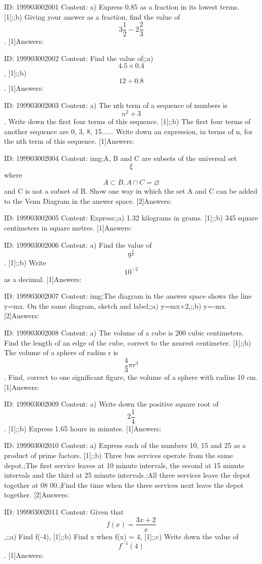 \documentclass{article}
\begin{document}
ID: 199903002001
Content:
a) Express 0.85 as a fraction in its lowest terms. [1];;b) Giving your answer as a fraction, find the value of $$3 \frac{1}{2} - 2 \frac{2}{3}$$. [1]Answers:

ID: 199903002002
Content:
Find the value of;;a) $$4.5 \times 0.4$$, [1];;b) $$12 \div 0.8$$. [1]Answers:

ID: 199903002003
Content:
a) The nth term of a sequence of numbers is $$n^2 + 3$$. Write down the first four terms of this sequence. [1];;b) The first four terms of another sequence are 0, 3, 8, 15...... Write down an expression, in terms of n, for the nth term of this sequence. [1]Answers:

ID: 199903002004
Content:
img;A, B and C are subsets of the universal set $$\xi$$ where $$A \subset B, A \cap C = \varnothing$$ and C is not a subset of B. Show one way in which the set A and C can be added to the Venn Diagram in the answer space. [2]Answers:

ID: 199903002005
Content:
Express;;a) 1.32 kilograms in grams. [1];;b) 345 square centimeters in square metres. [1]Answers:

ID: 199903002006
Content:
a) Find the value of $$9^{\frac{3}{2}}$$. [1];;b) Write $$10^{-2}$$ as a decimal. [1]Answers:

ID: 199903002007
Content:
img;The diagram in the answer space shows the line y=mx. On the same diagram, sketch and label;;a) y=mx+2,;;b) y=-mx. [2]Answers:

ID: 199903002008
Content:
a) The volume of a cube is 200 cubic centimeters. Find the length of an edge of the cube, correct to the nearest centimeter. [1];;b) The volume of a sphere of radius r is $$\frac{4}{3} \pi r^3$$. Find, correct to one significant figure, the volume of a sphere with radius 10 cm. [1]Answers:

ID: 199903002009
Content:
a) Write down the positive square root of $$2 \frac{1}{4}$$. [1];;b) Express 1.65 hours in minutes. [1]Answers:

ID: 199903002010
Content:
a) Express each of the numbers 10, 15 and 25 as a product of prime factors. [1];;b) Three bus services operate from the same depot.;The first service leaves at 10 minute intervals, the second at 15 minute intervals and the third at 25 minute intervals.;All three services leave the depot together at 08 00.;Find the time when the three services next leave the depot together. [2]Answers:

ID: 199903002011
Content:
Given that $$f(x) = \frac{3x+2}{x}$$,;;a) Find f(-4), [1];;b) Find x when f(x) = 4, [1];;c) Write down the value of $$f^{-1}(4)$$. [1]Answers:
\end{document}
